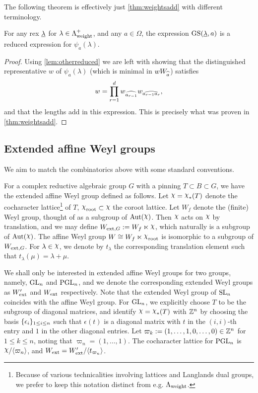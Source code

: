 The following theorem is effectively just \cref{thm:weightsadd} with different terminology.

\begin{theorem} \label{thm:GSrex} For any rex $\underline{\lambda}$ for $\lambda \in \Lambda^+_{\operatorname{weight}}$, and any $a \in \Omega$, the expression $\operatorname{GS}(\underline{\lambda},a)$ is a reduced expression for $\psi_a(\lambda)$. \end{theorem}

\begin{proof} Using \cref{lem:otherreduced} we are left with showing that the distinguished representative $w$ of $\psi_a(\lambda)$ (which is minimal in $w W_{\widehat{a}}$) satisfies 
\begin{equation} \label{foobarb} w = \prod_{r=1}^{d} w_{\widehat{a_{r-1}}} w_{\widehat{a_{r-1} a_{r}}}, \end{equation}
and that the lengths add in this expression.
This is precisely what was proven in \cref{thm:weightsadd}. \end{proof}

\subsection{Extended affine Weyl groups}\label{subsec extended affine Weyl groups} We aim to match the combinatorics above with some standard conventions.

For a complex reductive algebraic group $G$ with a pinning $T\subset B \subset G$, we have the extended affine Weyl group defined as follows. 
Let $\rchi=\rchi_*(T)$ denote the cocharacter lattice\footnote{Because of various technicalities involving lattices and Langlands dual groups, we prefer to keep this notation distinct from e.g. $\Lambda_{\operatorname{weight}}$.} of $T$, $\rchi_{\rt} \subset \rchi$ the coroot lattice.
Let $W_f$ denote the (finite) Weyl group, thought of as a subgroup of $\Aut(\rchi)$.
Then $\rchi$ acts on $\rchi$ by translation, and we may define $W_{\ext,G}:=W_f\ltimes \rchi$, which naturally is a subgroup of $\Aut(\rchi)$. 
The affine Weyl group $W \cong W_f \ltimes \rchi_{\rt}$ is isomorphic to a subgroup of $W_{\operatorname{ext}, G}$.
For $\lambda \in \rchi$, we denote by $t_\lambda$ the corresponding translation element such that $t_\lambda(\mu)=\lambda + \mu$.

We shall only be interested in extended affine Weyl groups for two groups, namely, $\operatorname{GL}_n$ and $\operatorname{PGL}_n$, and we denote the corresponding extended Weyl groups as $W_{\operatorname{ext}}'$ and $W_{\operatorname{ext}}$ respectively. Note that the extended Weyl group of $\operatorname{SL}_n$ coincides with the affine Weyl group. 
For $\operatorname{GL}_n$, we explicitly choose $T$ to be the subgroup of diagonal matrices, and identify $\rchi=\rchi_*(T)$ with $\mathbb{Z}^n$ by choosing the basis $\{\epsilon_i\}_{1 \leq i \leq n}$ such that $\epsilon(t)$ is a diagonal matrix with $t$ in the $(i,i)$-th entry and $1$ in the other diagonal entries.
Let $\varpi_k:=(1,\ldots,1,0,\ldots,0) \in \mathbb{Z}^n$ for $1\leq k \leq n$, noting that $\varpi_n=(1,\ldots, 1)$. The cocharacter lattice for $\operatorname{PGL}_n$ is $\rchi/\langle \varpi_n \rangle$, and $W_{\operatorname{ext}} = W'_{\operatorname{ext}}/\langle t_{\varpi_n} \rangle$.


